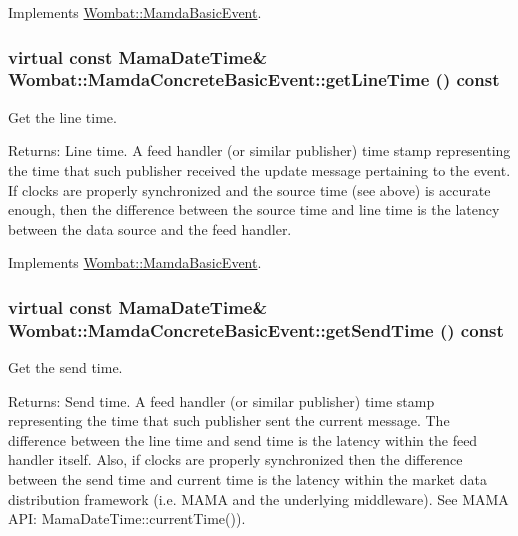 Implements \hyperlink{classWombat_1_1MamdaBasicEvent_b3810afc69474ef3b192ee4c9307e714}{Wombat::Mamda\-Basic\-Event}.\hypertarget{classWombat_1_1MamdaConcreteBasicEvent_a1859e79dc57601841701399a7aad8eb}{
\subsubsection[getLineTime]{\setlength{\rightskip}{0pt plus 5cm}virtual const Mama\-Date\-Time\& Wombat::Mamda\-Concrete\-Basic\-Event::get\-Line\-Time () const}}
\label{classWombat_1_1MamdaConcreteBasicEvent_a1859e79dc57601841701399a7aad8eb}


Get the line time. 

\begin{Desc}
\item[Returns:]Line time. A feed handler (or similar publisher) time stamp representing the time that such publisher received the update message pertaining to the event. If clocks are properly synchronized and the source time (see above) is accurate enough, then the difference between the source time and line time is the latency between the data source and the feed handler. \end{Desc}


Implements \hyperlink{classWombat_1_1MamdaBasicEvent_3fcc26fa1a6446bcec12b11ac74ed26d}{Wombat::Mamda\-Basic\-Event}.\hypertarget{classWombat_1_1MamdaConcreteBasicEvent_ae7959d79489a7d4c036c0cfadda6764}{
\subsubsection[getSendTime]{\setlength{\rightskip}{0pt plus 5cm}virtual const Mama\-Date\-Time\& Wombat::Mamda\-Concrete\-Basic\-Event::get\-Send\-Time () const}}
\label{classWombat_1_1MamdaConcreteBasicEvent_ae7959d79489a7d4c036c0cfadda6764}


Get the send time. 

\begin{Desc}
\item[Returns:]Send time. A feed handler (or similar publisher) time stamp representing the time that such publisher sent the current message. The difference between the line time and send time is the latency within the feed handler itself. Also, if clocks are properly synchronized then the difference between the send time and current time is the latency within the market data distribution framework (i.e. MAMA and the underlying middleware). See MAMA API: Mama\-Date\-Time::current\-Time()). \end{Desc}


